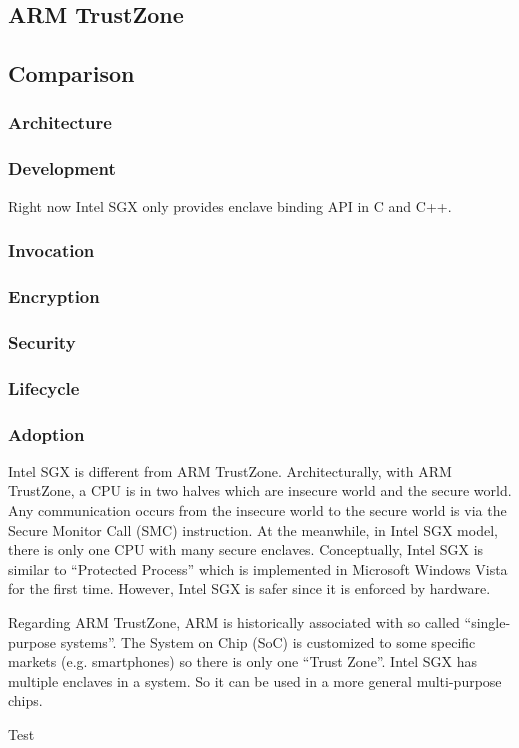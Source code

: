 \subsection{ARM TrustZone}

\subsection{Comparison}
\subsubsection{Architecture}
\subsubsection{Development}
Right now Intel SGX only provides enclave binding API in C and C++.

\subsubsection{Invocation}
\subsubsection{Encryption}
\subsubsection{Security}
\subsubsection{Lifecycle}
\subsubsection{Adoption}
Intel SGX is different from ARM TrustZone. Architecturally, with ARM TrustZone, a
CPU is in two halves which are insecure world and the secure world. Any 
communication occurs from the insecure world to the secure world is via the 
Secure Monitor Call (SMC) instruction. At the meanwhile, in Intel SGX model,
there is only one CPU with many secure enclaves. Conceptually, Intel SGX
is similar to ``Protected Process'' which is implemented in Microsoft Windows
Vista for the first time. However, Intel SGX is safer since it is enforced 
by hardware. 

Regarding ARM TrustZone, ARM is historically associated with so called ``single-
purpose systems''. The System on Chip (SoC) is customized to some specific markets
(e.g. smartphones) so there is only one ``Trust Zone''. Intel SGX has multiple 
enclaves in a system. So it can be used in a more general multi-purpose chips.     

Test~\cite{ChurchEncoding}
